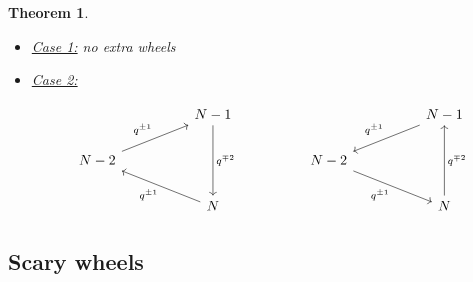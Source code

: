 \documentclass{amsart}
\newtheorem{theorem}[subsection]{Theorem}
\begin{document}
\begin{theorem}
\begin{itemize}[leftmargin=*]
\medskip 

\noindent \underline{Type $D$:} 

\medskip 

\item \underline{Case 1:} no extra wheels 

\medskip 

\item \underline{Case 2:} 

\begin{equation}
\label{eqn:wheel d 2}
\begin{tikzcd}
&& N-1 &&&& N-1 \\
N-2 &&&& N-2 \\
&& N &&&& N
\arrow["{q^{\mp 2}}", from=1-3, to=3-3]
\arrow["q^{\pm 1}"', from=1-7, to=2-5]
\arrow["q^{\pm 1}", from=2-1, to=1-3]
\arrow["q^{\pm 1}"', from=2-5, to=3-7]
\arrow["q^{\pm 1}", from=3-3, to=2-1]
\arrow["{q^{\mp 2}}"', from=3-7, to=1-7]
\end{tikzcd}
\end{equation}

\medskip 

\end{itemize}

\end{theorem}

\medskip 

\subsection{Scary wheels} 
\label{sub:scary}
\end{document}
